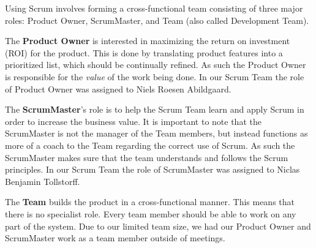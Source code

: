 Using Scrum involves forming a cross-functional team consisting of three major roles: Product Owner, ScrumMaster, and Team (also called Development Team).

The \textbf{Product Owner} is interested in maximizing the return on investment (ROI) for the product. This is done by translating product features into a prioritized list, which should be continually refined. As such the Product Owner is responsible for the \textit{value} of the work being done. In our Scrum Team the role of Product Owner was assigned to Niels Roesen Abildgaard.

The \textbf{ScrumMaster}'s role is to help the Scrum Team learn and apply Scrum in order to increase the business value. It is important to note that the ScrumMaster is not the manager of the Team members, but instead functions as more of a coach to the Team regarding the correct use of Scrum. As such the ScrumMaster makes sure that the team understands and follows the Scrum principles. In our Scrum Team the role of ScrumMaster was assigned to Niclas Benjamin Tollstorff.

The \textbf{Team} builds the product in a cross-functional manner. This means that there is no specialist role. Every team member should be able to work on any part of the system. Due to our limited team size, we had our Product Owner and ScrumMaster work as a team member outside of meetings.